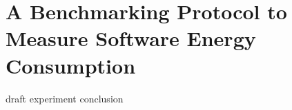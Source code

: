 
\chapter{A Benchmarking Protocol to Measure Software Energy Consumption}\label{chapter:benchmarking}

{draft}
{experiment}
{conclusion}

